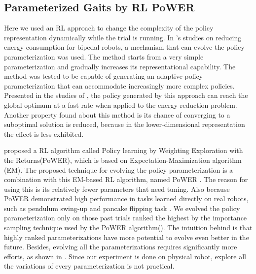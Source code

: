\subsection{Parameterized Gaits by RL PoWER}

Here we used an RL approach to change the complexity of the policy
representation dynamically while the trial is running. In
\cite{kormushev2011bipedal-walking-energya}'s studies on reducing energy
consumption for bipedal robots, a mechanism that can
evolve the policy parameterization was used. The method starts from a
very simple parameterization and gradually increases its
representational capability. The method was tested to be capable of generating
an adaptive policy parameterization that can accommodate increasingly
more complex policies. Presented in the studies of \cite{kormushev2011bipedal-walking-energya}, the policy
generated by this approach can reach the global optimum at a fast
rate when applied to the energy reduction problem. Another property found about this method is its chance of converging to a suboptimal solution is reduced, because in the lower-dimensional representation the effect is less exhibited.


\cite{kober2009learning-motor-primitives} proposed a RL algorithm
called Policy learning by Weighting Exploration with the
Returns(PoWER), which is based on Expectation-Maximization algorithm
(EM). The proposed technique for evolving the policy parameterization
is a combination with this EM-based RL algorithm, named PoWER \cite{kober2009learning-motor-primitives}. The reason for using this is its relatively fewer parameters that need tuning. Also because PoWER
demonstrated high performance in tasks learned directly on real
robots, such as pendulum swing-up and pancake flipping task \cite{kormushev2010robot-motor-skill}. We
evolved the policy parameterization only on those past trials ranked
the highest by the importance sampling technique used by the PoWER
algorithm(). The intuition behind is that highly ranked
parameterizations have more potential to evolve even better in the
future. Besides, evolving all the parameterizations requires
significantly more efforts, as shown in \cite{bongard2006resilient-machines-through}. Since our experiment
is done on physical robot, explore all the variations of every
parameterization is not practical. 

